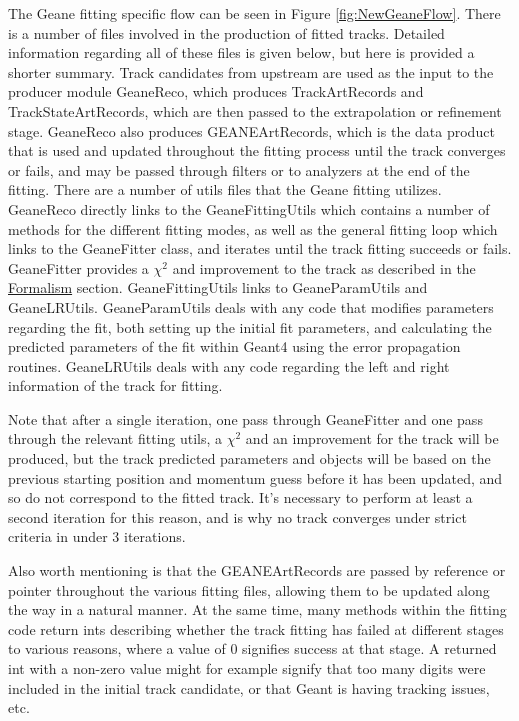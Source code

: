     The Geane fitting specific flow can be seen in Figure \ref{fig:NewGeaneFlow}. There is a number of files involved in the production of fitted tracks. Detailed information regarding all of these files is given below, but here is provided a shorter summary. Track candidates from upstream are used as the input to the producer module GeaneReco, which produces TrackArtRecords and TrackStateArtRecords, which are then passed to the extrapolation or refinement stage. GeaneReco also produces GEANEArtRecords, which is the data product that is used and updated throughout the fitting process until the track converges or fails, and may be passed through filters or to analyzers at the end of the fitting. There are a number of utils files that the Geane fitting utilizes. GeaneReco directly links to the GeaneFittingUtils which contains a number of methods for the different fitting modes, as well as the general fitting loop which links to the GeaneFitter class, and iterates until the track fitting succeeds or fails. GeaneFitter provides a $\chi^{2}$ and improvement to the track as described in the \hyperref[sec:Formalism]{Formalism} section. GeaneFittingUtils links to GeaneParamUtils and GeaneLRUtils. GeaneParamUtils deals with any code that modifies parameters regarding the fit, both setting up the initial fit parameters, and calculating the predicted parameters of the fit within Geant4 using the error propagation routines. GeaneLRUtils deals with any code regarding the left and right information of the track for fitting.
    
    Note that after a single iteration, one pass through GeaneFitter and one pass through the relevant fitting utils, a $\chi^{2}$ and an improvement for the track will be produced, but the track predicted parameters and objects will be based on the previous starting position and momentum guess before it has been updated, and so do not correspond to the fitted track. It's necessary to perform at least a second iteration for this reason, and is why no track converges under strict criteria in under 3 iterations.

    Also worth mentioning is that the GEANEArtRecords are passed by reference or pointer throughout the various fitting files, allowing them to be updated along the way in a natural manner. At the same time, many methods within the fitting code return ints describing whether the track fitting has failed at different stages to various reasons, where a value of 0 signifies success at that stage. A returned int with a non-zero value might for example signify that too many digits were included in the initial track candidate, or that Geant is having tracking issues, etc.


